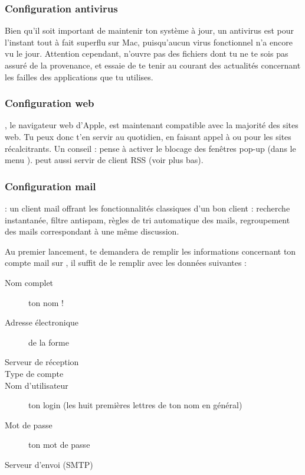 

\subsubsection{Configuration antivirus}

Bien qu'il soit important de maintenir ton système à jour, un antivirus est pour l'instant tout à fait superflu sur Mac, puisqu'aucun virus fonctionnel n'a encore vu le jour. Attention cependant, n'ouvre pas des fichiers dont tu ne te sois pas assuré de la provenance, et essaie de te tenir au courant des actualités concernant les failles des applications que tu utilises.

\subsubsection{Configuration web}

 , le navigateur web d'Apple, est maintenant compatible avec la majorité des sites web. Tu peux donc t'en servir au quotidien, en faisant appel à  ou  pour les sites récalcitrants. Un conseil : pense à activer le blocage des fenêtres pop-up (dans le menu ).  peut aussi servir de client RSS (voir plus bas).\\

\subsubsection{Configuration mail}

  : un client mail offrant les fonctionnalités classiques d'un bon client : recherche instantanée, filtre antispam, règles de tri automatique des mails, regroupement des mails correspondant à une même discussion.

Au premier lancement,  te demandera de remplir les informations concernant ton compte mail sur , il suffit de le remplir avec les données suivantes :

\begin{description}
  \item[Nom complet] ton nom !
  \item[Adresse électronique] de la forme 
  \item[Serveur de réception] 
  \item[Type de compte] 
  \item[Nom d'utilisateur] ton login  (les huit premières lettres de ton nom en général)
  \item[Mot de passe] ton mot de passe 
  \item[Serveur d'envoi (SMTP)] 
\end{description}

